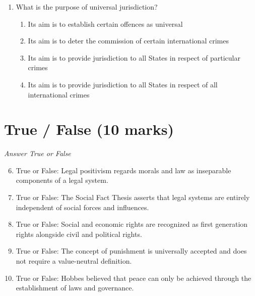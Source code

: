 \documentclass[12pt]{article}
\begin{document}
\begin{enumerate}[label=\arabic*.]
\begin{enumerate}[label=(\alph*)]
    \item Sovereignty means being recognised by all other States
    \item Sovereignty means to be able to enter into treaties and join the UN
    \item Sovereignty means freedom to determine one's own affairs without external interference
    \item Sovereignty means possessing the right to defend oneself
\end{enumerate}
\item What is the purpose of universal jurisdiction?
\begin{enumerate}[label=(\alph*)]
    \item Its aim is to establish certain offences as universal
    \item Its aim is to deter the commission of certain international crimes
    \item Its aim is to provide jurisdiction to all States in respect of particular crimes
    \item Its aim is to provide jurisdiction to all States in respect of all international crimes
\end{enumerate}
\end{enumerate}

\section*{True / False (10 marks)}
\textit{Answer True or False}
\begin{enumerate}[label=\arabic*.]
\setcounter{enumi}{5}
\item True or False: Legal positivism regards morals and law as inseparable components of a legal system.
\item True or False: The Social Fact Thesis asserts that legal systems are entirely independent of social forces and influences.
\item True or False: Social and economic rights are recognized as first generation rights alongside civil and political rights.
\item True or False: The concept of punishment is universally accepted and does not require a value-neutral definition.
\item True or False: Hobbes believed that peace can only be achieved through the establishment of laws and governance.
\end{enumerate}
\end{document}
